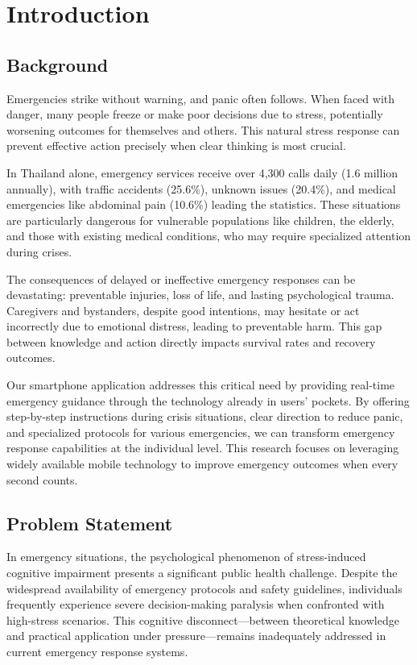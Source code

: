\chapter{Introduction}
\label{chap:introduction}

\section{Background}
\label{section:background}

Emergencies strike without warning, and panic often follows. When faced with danger, many people freeze or make poor decisions due to stress, potentially worsening outcomes for themselves and others. This natural stress response can prevent effective action precisely when clear thinking is most crucial.

In Thailand alone, emergency services receive over 4,300 calls daily (1.6 million annually), with traffic accidents (25.6\%), unknown issues (20.4\%), and medical emergencies like abdominal pain (10.6\%) leading the statistics. These situations are particularly dangerous for vulnerable populations like children, the elderly, and those with existing medical conditions, who may require specialized attention during crises.

The consequences of delayed or ineffective emergency responses can be devastating: preventable injuries, loss of life, and lasting psychological trauma. Caregivers and bystanders, despite good intentions, may hesitate or act incorrectly due to emotional distress, leading to preventable harm. This gap between knowledge and action directly impacts survival rates and recovery outcomes.

Our smartphone application addresses this critical need by providing real-time emergency guidance through the technology already in users' pockets. By offering step-by-step instructions during crisis situations, clear direction to reduce panic, and specialized protocols for various emergencies, we can transform emergency response capabilities at the individual level. This research focuses on leveraging widely available mobile technology to improve emergency outcomes when every second counts.

\section{Problem Statement}
\label{section:problem-statement}

In emergency situations, the psychological phenomenon of stress-induced cognitive impairment presents a significant public health challenge. Despite the widespread availability of emergency protocols and safety guidelines, individuals frequently experience severe decision-making paralysis when confronted with high-stress scenarios. This cognitive disconnect—between theoretical knowledge and practical application under pressure—remains inadequately addressed in current emergency response systems.

